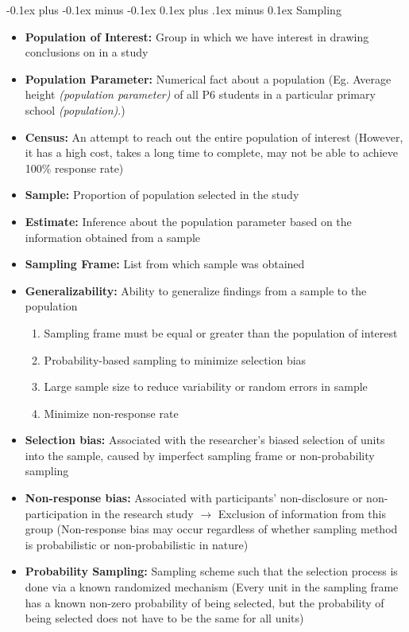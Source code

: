 \documentclass[landscape]{article}
\makeatletter
\renewcommand{\subsection}{\@startsection{subsection}{2}{0mm}%
  {-0.1ex plus -0.1ex minus -0.1ex}%
  {0.1ex plus .1ex minus 0.1ex}%
{\normalfont\scriptsize\bfseries}}
\makeatother
\begin{document}
\begin{multicols*}{5}
    \subsection{Sampling}
      \begin{itemize}
        \item \textbf{Population of Interest:} Group in which we have interest in drawing conclusions on in a study
        \item \textbf{Population Parameter:} Numerical fact about a population (Eg. Average height \textit{(population parameter)} of all P6 students in a particular primary school \textit{(population)}.)
        \item \textbf{Census:} An attempt to reach out the entire population of interest (However, it has a high cost, takes a long time to complete, may not be able to achieve 100\% response rate)
        \item \textbf{Sample:} Proportion of population selected in the study
        \item \textbf{Estimate:} Inference about the population parameter based on the information obtained from a sample
        \item \textbf{Sampling Frame:} List from which sample was obtained
        \item \textbf{Generalizability:} Ability to generalize findings from a sample to the population
        \begin{enumerate}
          \item Sampling frame must be equal or greater than the population of interest
          \item Probability-based sampling to minimize selection bias
          \item Large sample size to reduce variability or random errors in sample
          \item Minimize non-response rate
        \end{enumerate}
        \item \textbf{Selection bias:} Associated with the researcher's biased selection of units into the sample, caused by imperfect sampling frame or non-probability sampling
        \item \textbf{Non-response bias:} Associated with participants' non-disclosure or non-participation in the research study $\rightarrow$ Exclusion of information from this group (Non-response bias may occur regardless of whether sampling method is probabilistic or non-probabilistic in nature)
        \item \textbf{Probability Sampling:} Sampling scheme such that the selection process is done via a known randomized mechanism (Every unit in the sampling frame has a known non-zero probability of being selected, but the probability of being selected does not have to be the same for all units)

\end{itemize}
\end{multicols*}
\end{document}
